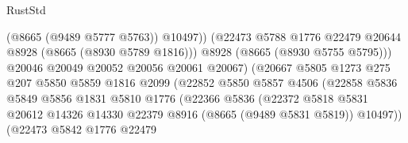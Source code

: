 \begin{lexlean}{RustStd}
\begin{coremodule}
                                            (@8665 (@9489 @5777 @5763))
                                            @10497))
                                        (@22473
                                          @5788
                                          @1776
                                          @22479
                                          @20644
                                          @8928
                                          (@8665 (@8930 @5789 @1816)))
                                        @8928
                                        (@8665 (@8930 @5755 @5795)))
                                      @20046
                                      @20049
                                      @20052
                                      @20056
                                      @20061
                                      @20067)
                                    (@20667
                                      @5805
                                      @1273
                                      @275
                                      @207
                                      @5850
                                      @5859
                                      @1816
                                      @2099
                                      (@22852
                                        @5850
                                        @5857
                                        @4506
                                        (@22858
                                          @5836
                                          @5849
                                          @5856
                                          @1831
                                          @5810
                                          @1776
                                          (@22366
                                            @5836
                                            (@22372
                                              @5818
                                              @5831
                                              @20612
                                              @14326
                                              @14330
                                              @22379
                                              @8916
                                              (@8665 (@9489 @5831 @5819))
                                              @10497))
                                          (@22473
                                            @5842
                                            @1776
                                            @22479

\end{coremodule}
\end{lexlean}
